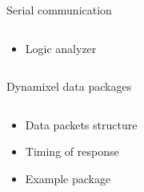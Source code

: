 \documentclass{beamer}
\begin{document}

\begin{frame}{Serial communication}

    \begin{columns}
        \begin{column}[]{0.5\textwidth}
            \begin{itemize}
                \item Logic analyzer
            \end{itemize}
        \end{column}
        
        
        \begin{column}[]{0.5\textwidth}
        \end{column}
    \end{columns}
    
\end{frame}



\begin{frame}{Dynamixel data packages}

    \begin{columns}
        \begin{column}[]{0.5\textwidth}
            \begin{itemize}
                \item Data packets structure
                \item Timing of response
                \item Example package
            \end{itemize}
        \end{column}
        
        
        \begin{column}[]{0.5\textwidth}
        \end{column}
    \end{columns}
    
\end{frame}

\end{document}
